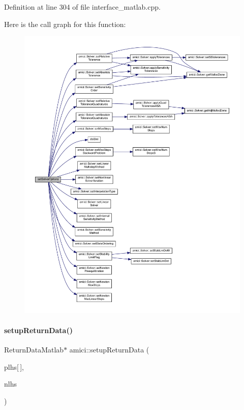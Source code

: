 Definition at line 304 of file interface\+\_\+matlab.\+cpp.

Here is the call graph for this function\+:
\nopagebreak
\begin{figure}[H]
\begin{center}
\leavevmode
\includegraphics[width=350pt]{namespaceamici_aab6be0027d918715e2ba50828088110b_cgraph}
\end{center}
\end{figure}
\mbox{\label{namespaceamici_a91a3ac85998f7dd60d633882e9504b07}} 
\paragraph{\texorpdfstring{setup\+Return\+Data()}{setupReturnData()}}
{\footnotesize\ttfamily Return\+Data\+Matlab$\ast$ amici\+::setup\+Return\+Data (\begin{DoxyParamCaption}\item[{mx\+Array $\ast$}]{plhs\mbox{[}$\,$\mbox{]},  }\item[{int}]{nlhs }\end{DoxyParamCaption})}

